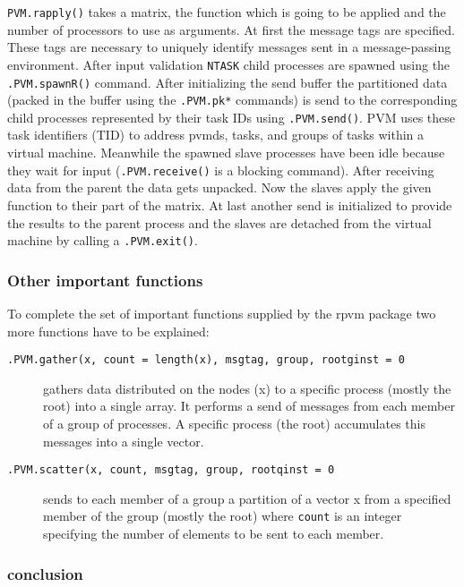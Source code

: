 \texttt{PVM.rapply()} takes a matrix, the function which is going to
be applied and the number of processors to use as arguments. At first
the message tags are specified. These tags are necessary to uniquely
identify messages sent in a message-passing environment. After
input validation \texttt{NTASK} child processes are spawned using the
\texttt{.PVM.spawnR()} command. After initializing the send buffer the
partitioned data (packed in the buffer using the \texttt{.PVM.pk*}
commands) is send to the corresponding child processes represented by
their task IDs using
\texttt{.PVM.send()}. PVM uses these task identifiers (TID) to
address pvmds, tasks, and groups of tasks within a virtual machine.
Meanwhile the spawned slave processes have been idle because they wait
for input (\texttt{.PVM.receive()} is a blocking command). After
receiving data from the parent the data gets unpacked. Now the slaves
apply the given function to their part of the matrix. At last another
send is initialized to provide the results to the parent process and
the slaves are detached from the virtual machine by calling a
\texttt{.PVM.exit()}. 

\subsubsection{Other important functions}

To complete the set of important functions supplied by the rpvm
package two more functions have to be explained:

\begin{description}
\item[\texttt{.PVM.gather(x, count = length(x), msgtag, group,
    rootginst = 0}] gathers data distributed on the nodes (x) to a
  specific process (mostly the root) into a single array. It performs
  a send of messages from each member of a group of processes. A
  specific process (the root) accumulates this messages into a single vector.
\item[\texttt{.PVM.scatter(x, count, msgtag, group, rootqinst = 0}]
  sends to each member of a group a partition of  a vector x from a
  specified member of the group (mostly the root) where \texttt{count}
  is an integer specifying the number of elements to be sent to each
  member. 
\end{description}

\subsubsection{conclusion}

